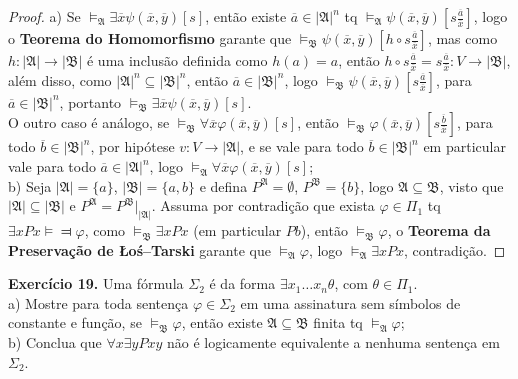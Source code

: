 \documentclass[11pt]{article}
\newcommand{\mf}[1]{\mathfrak{#1}}
\begin{document}
\begin{proof}
    a) Se $\vDash_\mf{A}\exists\overline{x}\psi(\overline{x},\overline{y})[s]$, então existe $\overline{a}\in|\mf{A}|^n$ tq $\vDash_\mf{A}\psi(\overline{x},\overline{y})\left[s\tfrac{\overline{a}}{\overline{x}}\right]$, logo o \textbf{Teorema do Homomorfismo} garante que $\vDash_\mf{B}\psi(\overline{x},\overline{y})\left[h\circ s\tfrac{\overline{a}}{\overline{x}}\right]$, mas como $h:|\mf{A}|\to|\mf{B}|$ é uma inclusão definida como $h(a)=a$, então $h\circ s\frac{\overline{a}}{\overline{x}}=s\frac{\overline{a}}{\overline{x}}:V\to|\mf{B}|$, além disso, como $|\mf{A}|^n\subseteq|\mf{B}|^n$, então $\overline{a}\in|\mf{B}|^n$, logo $\vDash_\mf{B}\psi(\overline{x},\overline{y})\left[s\frac{\overline{a}}{\overline{x}}\right]$, para $\overline{a}\in|\mf{B}|^n$, portanto $\vDash_\mf{B}\exists\overline{x}\psi(\overline{x},\overline{y})[s]$.\\
    O outro caso é análogo, se $\vDash_\mf{B}\forall\overline{x}\varphi(\overline{x},\overline{y})[s]$, então $\vDash_\mf{B}\varphi(\overline{x},\overline{y})\left[s\tfrac{\overline{b}}{\overline{x}}\right]$, para todo $\overline{b}\in|\mf{B}|^n$, por hipótese $v:V\to|\mf{A}|$, e se vale para todo $\overline{b}\in|\mf{B}|^n$ em particular vale para todo $\overline{a}\in|\mf{A}|^n$, logo $\vDash_\mf{A}\forall\overline{x}\varphi(\overline{x},\overline{y})[s]$;\\
    b) Seja $|\mf{A}|=\{a\}$, $|\mf{B}|=\{a,b\}$ e defina $P^\mf{A}=\emptyset$, $P^\mf{B}=\{b\}$, logo $\mf{A}\subseteq\mf{B}$, visto que $|\mf{A}|\subseteq|\mf{B}|$ e $P^\mf{A}=P^\mf{B}\vert_{|\mf{A}|}$. Assuma por contradição que exista $\varphi\in\Pi_1$ tq $\exists xPx\vDash\Dashv\varphi$, como $\vDash_\mf{B}\exists xPx$ (em particular $Pb$), então $\vDash_\mf{B}\varphi$, o \textbf{Teorema da Preservação de Łoś–Tarski} garante que $\vDash_\mf{A}\varphi$, logo $\vDash_\mf{A}\exists xPx$, contradição.
\end{proof}

\begin{shaded}
\textbf{Exercício 19.} Uma fórmula $\Sigma_2$ é da forma $\exists x_1\dots x_n\theta$, com $\theta\in\Pi_1$.\\
a) Mostre para toda sentença $\varphi\in\Sigma_2$ em uma assinatura sem símbolos de constante e função, se $\vDash_\mf{B}\varphi$, então existe $\mf{A}\subseteq\mf{B}$ finita tq $\vDash_\mf{A}\varphi$;\\
b) Conclua que $\forall x\exists yPxy$ não é logicamente equivalente a nenhuma sentença em $\Sigma_2$.
\end{shaded}
\end{document}
